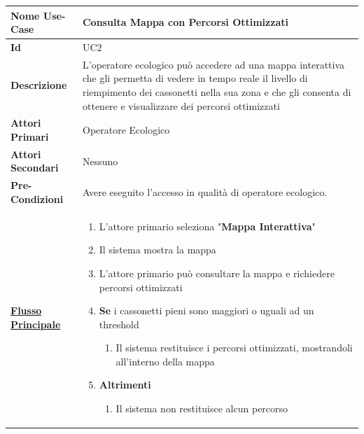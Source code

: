         \begin{table}[h]
            \centering
            \renewcommand{\arraystretch}{1.3} %
            \begin{tabular}{|p{4cm}|p{10cm}|}
                \hline
                \textbf{Nome Use-Case}& \textbf{Consulta Mappa con Percorsi Ottimizzati}\\
                \hline
                \textbf{Id} & UC2   \\
                \hline
                \textbf{Descrizione}& L'operatore ecologico può accedere ad una mappa interattiva che gli permetta di vedere in tempo reale il livello
                                    di riempimento dei cassonetti nella sua zona e che gli consenta di ottenere e visualizzare dei percorsi ottimizzati\\
                \hline
                \textbf{Attori Primari}& Operatore Ecologico\\
                \hline
                \textbf{Attori Secondari}& Nessuno\\
                \hline
                \textbf{Pre-Condizioni}& Avere eseguito l'accesso in qualità di operatore ecologico.\\
                \hline
                \textbf{\hyperref[fig:BPMN] {Flusso Principale}}& 
                \begin{enumerate}
                    \item L'attore primario seleziona "\textbf{Mappa Interattiva}"
                    \item Il sistema mostra la mappa
                    \item L'attore primario può consultare la mappa e richiedere percorsi ottimizzati
                    \item  \textbf{Se} i cassonetti pieni sono maggiori o uguali ad un threshold
                \begin{enumerate}
                    \item Il sistema restituisce i percorsi ottimizzati, mostrandoli all'interno della mappa
                \end{enumerate}
                \item  \textbf{Altrimenti}
                \begin{enumerate}
                    \item Il sistema non restituisce alcun percorso
                \end{enumerate}
                \end{enumerate}

\end{tabular}
\end{table}

